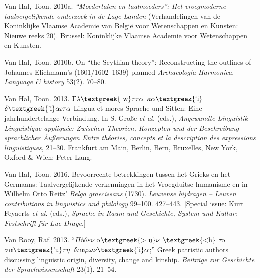 \begin{styleStandard}
Van Hal, Toon. 2010a. \textit{“Moedertalen en taalmoeders”: Het vroegmoderne taalvergelijkende onderzoek in de Lage Landen} (Verhandelingen van de Koninklijke Vlaamse Academie van België voor Wetenschappen en Kunsten: Nieuwe reeks 20). Brussel: Koninklijke Vlaamse Academie voor Wetenschappen en Kunsten.
\end{styleStandard}

\begin{styleStandard}
Van Hal, Toon. 2010b. On “the Scythian theory”: Reconstructing the outlines of Johannes Elichmann’s (1601/1602–1639) planned \textit{Archaeologia Harmonica}. \textit{Language \& history} 53(2). 70–80.
\end{styleStandard}

\begin{styleStandard}
Van Hal, Toon. 2013. $\Gamma \lambda \text{\textgreek{~w}}\tau \tau \alpha $ $\kappa \alpha \text{\textgreek{`i}}$ $\delta \text{\textgreek{'i}}\alpha \iota \tau \alpha $ {\textbar} Lingua et mores {\textbar} Sprache und Sitten: Eine jahrhundertelange Verbindung. In S. Große \textit{et al.} (eds.), \textit{Angewandte Linguistik {\textbar} Linguistique appliquée: Zwischen Theorien, Konzepten und der Beschreibung sprachlicher Äußerungen {\textbar} Entre théories, concepts et la description des expressions linguistiques}, 21–30. Frankfurt am Main, Berlin, Bern, Bruxelles, New York, Oxford \& Wien: Peter Lang.
\end{styleStandard}

\begin{styleStandard}
Van Hal, Toon. 2016. Bevoorrechte betrekkingen tussen het Grieks en het Germaans: Taalvergelijkende verkenningen in het Vroegduitse humanisme en in Wilhelm Otto Reitz’ \textit{Belga graecissans} (1730). \textit{Leuvense bijdragen – Leuven contributions in linguistics and philology} 99–100. 427–443. [Special issue: Kurt Feyaerts \textit{et al. }(eds.), \textit{Sprache in Raum und Geschichte, System und Kultur: Festschrift für Luc Draye}.]
\end{styleStandard}

\begin{styleStandard}
Van Rooy, Raf. 2013. “$\Pi $ó$\theta \varepsilon \nu $ o$\text{\textgreek{>~u}}\nu $ $\text{\textgreek{<h}}$ $\tau $o$\sigma \alpha \text{\textgreek{'u}}\tau \eta $ $\delta \iota \alpha \varphi \omega \nu \text{\textgreek{'i}}\alpha $;” Greek patristic authors discussing linguistic origin, diversity, change and kinship. \textit{Beiträge zur Geschichte der Sprachwissenschaft} 23(1). 21–54.
\end{styleStandard}

